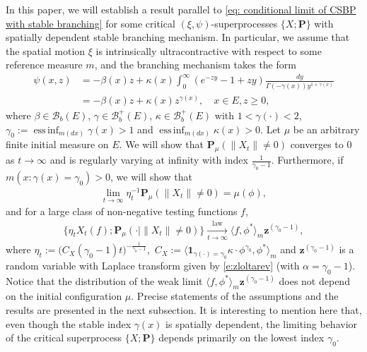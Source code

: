 \documentclass[12pt,a4paper]{amsart}
\theoremstyle{definition}
\numberwithin{equation}{section}
\begin{document}
In this paper, we will establish a result parallel to \eqref{eq: conditional limit of CSBP with stable branching} for some critical $(\xi,\psi)$-superprocesses $\{X; \mathbf P\}$ with spatially dependent stable branching mechanism.
In particular, we assume that the spatial motion $\xi$ is intrinsically ultracontractive with respect to some reference measure $m$, and the branching mechanism takes the form
\begin{align}
	\psi(x,z)
  &= - \beta(x) z + \kappa(x) \int_0^\infty (e^{-z y} - 1+ z y) \frac{dy}{\Gamma(- \gamma(x)) y^{1+ \gamma(x)}}
  \\&=  -\beta (x) z + \kappa(x) z^{\gamma(x)},
	\quad x\in E, z \geq 0,
\end{align}
where $\beta \in \mathscr B_b(E)$, $\gamma \in \mathscr B^+_b(E)$, $\kappa \in \mathscr B^+_b(E)$ with $1< \gamma(\cdot )<2$, $\gamma_0 := \operatorname{ess\,inf}_{m(dx)} \gamma(x)> 1$ and $\operatorname{ess\,inf}_{m(dx)}\kappa(x) > 0$.
Let $\mu$ be an arbitrary finite initial measure on $E$.
We will show that $\mathbf P_{\mu}( \| X_t\| \neq 0)$ converges to $0$ as $t\to \infty$ and is regularly varying at infinity with index $\frac{1}{\gamma_0 - 1}$.
Furthermore, if $m(x: \gamma(x) = \gamma_0)>0$, we will show that
\begin{align}
	\lim_{t\to \infty}\eta^{-1}_t \mathbf P_{\mu}( \|X_t\| \neq0)
	= \mu(\phi),
\end{align}
and for a large class of non-negative testing functions $f$,
\begin{align}\label{eq: result2}
	\{ \eta_t X_t(f) ; \mathbf P_{\mu}(\cdot | \|X_t\|\neq 0) \}
	\xrightarrow[t\to \infty]{\operatorname{law}}
	\langle f, \phi^*\rangle_m \mathbf z^{(\gamma_0 - 1)},
\end{align}
where $\eta_t := \big( C_X(\gamma_0 - 1) t \big)^{- \frac {1} {\gamma_0 - 1} },$ $C_X := \langle \mathbf 1_{\gamma(\cdot) = \gamma_0} \kappa\cdot \phi^{\gamma_0}, \phi^* \rangle_m$ and $\mathbf z^{(\gamma_0 - 1)}$ is a random variable with Laplace transform given by \eqref{e:zloltarev} (with $\alpha=\gamma_0-1$).
Notice that the distribution of the weak limit $\langle f, \phi^*\rangle_m \mathbf z^{(\gamma_0 - 1)}$ does not depend on the initial configuration $\mu$.
Precise statements of the assumptions and the results are presented in the next subsection.
It is interesting to mention here that, even though the stable index $\gamma(x)$ is spatially dependent, the limiting behavior of the critical superprocess $\{X; \mathbf P\}$ depends primarily on the lowest index $\gamma_0$.
\end{document}
